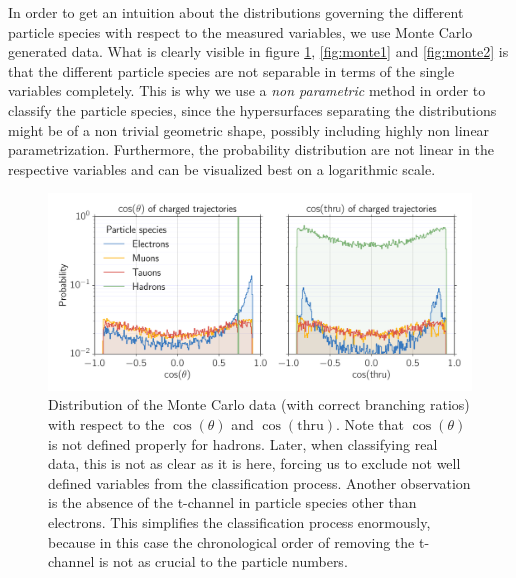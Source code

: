 \label{sub:montecarlo}
In order to get an intuition about the distributions governing the different particle species with respect to the measured
variables, we use Monte Carlo generated data. 
What is clearly visible in figure \ref{fig:cos_figs}, \ref{fig:monte1} and \ref{fig:monte2} is that the
different particle species are not separable in terms of the single variables completely. This is why we use a 
\textit{non parametric} method in order to classify the particle species, since the hypersurfaces separating the distributions
might be of a non trivial geometric shape, possibly including highly non linear parametrization. 
Furthermore, the probability distribution are not linear in the respective variables and can be visualized best on a logarithmic 
scale.
\begin{figure}[htpb]
    \centering
    \includegraphics[width=1.0\linewidth]{figures/cos_figs}
    \caption{Distribution of the Monte Carlo data (with correct branching ratios) 
    with respect to the $\cos(\theta)$ and $\cos(\mathrm{thru})$. Note that $\cos(\theta)$ is not defined properly
    for hadrons. Later, when classifying
    real data, this is not as clear as it is here, forcing us to exclude not well defined variables from the classification process.
    Another observation is the absence of the t-channel in particle species other than electrons. This simplifies 
    the classification process enormously, because in this case the chronological 
    order of removing the t-channel is not as crucial to the particle numbers.}
    \label{fig:cos_figs}
\end{figure}

